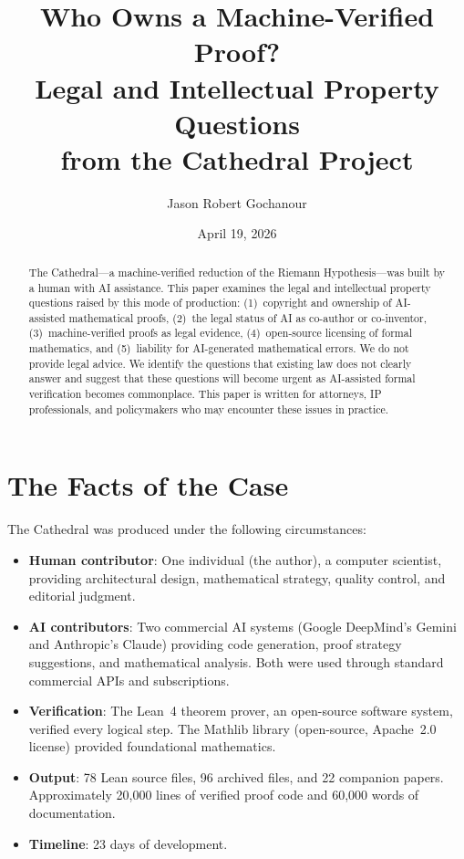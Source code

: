\documentclass[11pt,a4paper]{article}
\title{%
  Who Owns a Machine-Verified Proof?\\
  Legal and Intellectual Property Questions\\
  from the Cathedral Project%
}
\author{
  Jason Robert Gochanour
}
\date{April 19, 2026}
\begin{document}
\maketitle

\begin{abstract}
The Cathedral---a machine-verified reduction of the Riemann
Hypothesis---was built by a human with AI assistance. This paper
examines the legal and intellectual property questions raised by
this mode of production: (1)~copyright and ownership of
AI-assisted mathematical proofs, (2)~the legal status of AI as
co-author or co-inventor, (3)~machine-verified proofs as legal
evidence, (4)~open-source licensing of formal mathematics, and
(5)~liability for AI-generated mathematical errors. We do not
provide legal advice. We identify the questions that existing law
does not clearly answer and suggest that these questions will
become urgent as AI-assisted formal verification becomes
commonplace. This paper is written for attorneys, IP professionals,
and policymakers who may encounter these issues in practice.
\end{abstract}

\tableofcontents

\section{The Facts of the Case}

The Cathedral was produced under the following circumstances:

\begin{itemize}
  \item \textbf{Human contributor}: One individual (the author),
    a computer scientist, providing architectural design,
    mathematical strategy, quality control, and editorial judgment.

  \item \textbf{AI contributors}: Two commercial AI systems
    (Google DeepMind's Gemini and Anthropic's Claude) providing
    code generation, proof strategy suggestions, and mathematical
    analysis. Both were used through standard commercial APIs and
    subscriptions.

  \item \textbf{Verification}: The Lean~4 theorem prover, an
    open-source software system, verified every logical step.
    The Mathlib library (open-source, Apache~2.0 license) provided
    foundational mathematics.

  \item \textbf{Output}: 78 Lean source files, 96 archived files,
    and 22 companion papers. Approximately 20,000 lines of
    verified proof code and 60,000 words of documentation.

  \item \textbf{Timeline}: 23 days of development.
\end{itemize}
\end{document}
